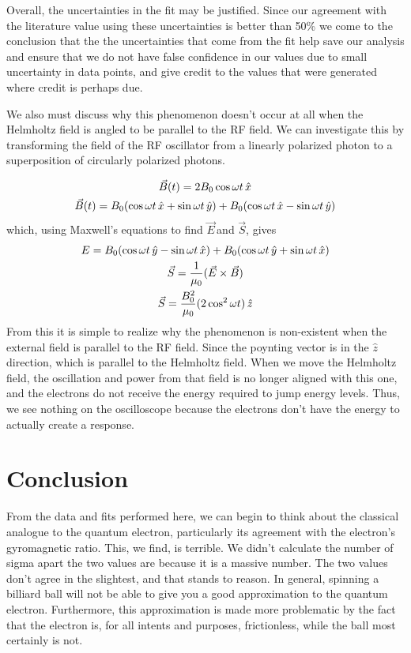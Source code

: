 \documentclass{article}
\newcommand{\E}{$\vec{E}\,$}
\DeclarePairedDelimiter{\parens}{\lparen}{\rparen}
\begin{document}
	Overall, the uncertainties in the fit may be justified.  Since our agreement with the literature value using these uncertainties is better than 50\% we come to the conclusion that the the uncertainties that come from the fit help save our analysis and ensure that we do not have false confidence in our values due to small uncertainty in data points, and give credit to the values that were generated where credit is perhaps due.

	\vspace{.25cm}

	We also must discuss why this phenomenon doesn't occur at all when the Helmholtz field is angled to be parallel to the RF field.  We can investigate this by transforming the field of the RF oscillator from a linearly polarized photon to a superposition of circularly polarized photons.

	\begin{gather*}
		\vec{B}(t) = 2B_0\cos{\omega t}\,\hat{x}\\
		\vec{B}(t) = B_0\parens{\cos{\omega t}\,\hat{x} + \sin{\omega t}\,\hat{y}} + B_0\parens{\cos{\omega t}\,\hat{x} - \sin{\omega t}\,\hat{y}}
	\end{gather*}
	which, using Maxwell's equations to find \E and $\vec{S}$, gives
	\begin{gather*}
		E = B_0\parens{\cos{\omega t}\,\hat{y} - \sin{\omega t}\,\hat{x}} + B_0\parens{\cos{\omega t}\,\hat{y} + \sin{\omega t}\,\hat{x}}\\
		\vec{S} = \frac{1}{\mu_0}\parens{\vec{E} \times \vec{B}}\\
		\vec{S} = \frac{B_0^2}{\mu_0}\parens{2\cos^2{\omega t}}\,\hat{z}
	\end{gather*}
	From this it is simple to realize why the phenomenon is non-existent when the external field is parallel to the RF field.  Since the poynting vector is in the $\hat{z}$ direction, which is parallel to the Helmholtz field.  When we move the Helmholtz field, the oscillation and power from that field is no longer aligned with this one, and the electrons do not receive the energy required to jump energy levels.  Thus, we see nothing on the oscilloscope because the electrons don't have the energy to actually create a response.

\section{Conclusion}
	From the data and fits performed here, we can begin to think about the classical analogue to the quantum electron, particularly its agreement with the electron's gyromagnetic ratio.  This, we find, is terrible.  We didn't calculate the number of sigma apart the two values are because it is a massive number.  The two values don't agree in the slightest, and that stands to reason.  In general, spinning a billiard ball will not be able to give you a good approximation to the quantum electron.  Furthermore, this approximation is made more problematic by the fact that the electron is, for all intents and purposes, frictionless, while the ball most certainly is not.
\end{document}
